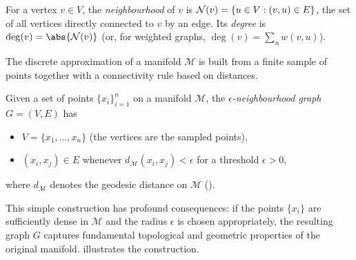 \begin{definition}[Neighbourhood]
\label{def:graphs:neighbourhood}
For a vertex $v \in V$, the \emph{neighbourhood} of $v$ is
$\mathcal{N}(v) = \{u \in V : (v,u) \in E\}$, the set of all vertices directly connected
to $v$ by an edge. Its \emph{degree} is $\deg(v) = \abs{\Nbr(v)}$ (or, for
weighted graphs, $\deg(v) = \sum_{u} w(v,u)$).
\end{definition}

The discrete approximation of a manifold $\mathcal{M}$ is built from a finite
sample of points together with a connectivity rule based on distances.

\begin{definition}
\label{def:graphs:epsilon}
Given a set of points $\{x_i\}_{i=1}^n$ on a manifold $\mathcal{M}$, the
\emph{$\epsilon$-neighbourhood graph} $G = (V, E)$ has
\begin{itemize}
  \item $V = \{x_1, \dots, x_n\}$ (the vertices are the sampled points),
  \item $(x_i, x_j) \in E$ whenever $d_{\mathcal{M}}(x_i, x_j) < \epsilon$ for a
        threshold $\epsilon > 0$,
\end{itemize}
where $d_{\mathcal{M}}$ denotes the geodesic distance on $\mathcal{M}$
().
\end{definition}

This simple construction has profound consequences: if the points $\{x_i\}$ are
sufficiently dense in $\mathcal{M}$ and the radius $\epsilon$ is chosen
appropriately, the resulting graph $G$ captures fundamental topological and
geometric properties of the original manifold. 
illustrates the construction.

